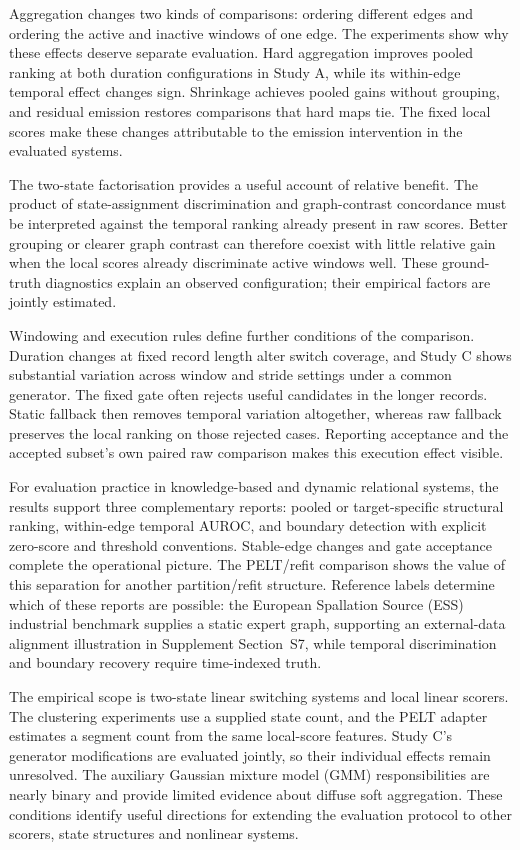 Aggregation changes two kinds of comparisons: ordering different edges and
ordering the active and inactive windows of one edge. The experiments show
why these effects deserve separate evaluation. Hard aggregation improves
pooled ranking at both duration configurations in Study A, while its
within-edge temporal effect changes sign. Shrinkage achieves pooled gains
without grouping, and residual emission restores comparisons that hard
maps tie. The fixed local scores make these changes attributable to the
emission intervention in the evaluated systems.

The two-state factorisation provides a useful account of relative benefit.
The product of state-assignment discrimination and graph-contrast concordance
must be interpreted against the temporal ranking already present in raw
scores. Better grouping or clearer graph contrast can therefore coexist with
little relative gain when the local scores already discriminate active windows
well. These ground-truth diagnostics explain an observed configuration;
their empirical factors are jointly estimated.

Windowing and execution rules define further conditions of the comparison.
Duration changes at fixed record length alter switch coverage, and Study C
shows substantial variation across window and stride settings under a common
generator. The fixed gate often rejects useful candidates in the longer
records. Static fallback then removes temporal variation altogether, whereas
raw fallback preserves the local ranking on those rejected cases. Reporting
acceptance and the accepted subset's own paired raw comparison makes this
execution effect visible.

For evaluation practice in knowledge-based and dynamic relational systems, the
results support three complementary reports:
pooled or target-specific structural ranking, within-edge temporal AUROC,
and boundary detection with explicit zero-score and threshold conventions.
Stable-edge changes and gate acceptance complete the operational picture.
The PELT/refit comparison shows the value of this separation for another
partition/refit structure. Reference labels determine which of these reports
are possible: the European Spallation Source (ESS) industrial benchmark
\citep{mogensen2024causal} supplies a static expert graph,
supporting an external-data alignment illustration in Supplement Section~S7,
while temporal discrimination and boundary recovery require time-indexed truth.

The empirical scope is two-state linear switching systems and local linear
scorers. The clustering experiments use a supplied state count, and the PELT
adapter estimates a segment count from the same local-score features.
Study C's generator modifications are evaluated jointly, so their individual
effects remain unresolved. The auxiliary Gaussian mixture model (GMM) responsibilities are nearly
binary and provide limited evidence about diffuse soft aggregation.
These conditions identify useful directions for extending the evaluation
protocol to other scorers, state structures and nonlinear systems.

